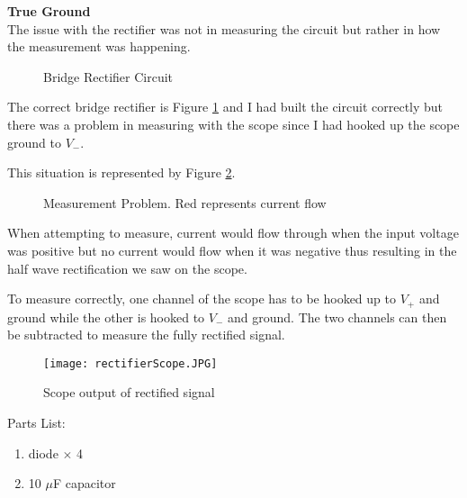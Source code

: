 \documentclass[oneside]{tufte-book}
\newenvironment{loggentry}[2]%
{\noindent\huge{\textbf{#2}}\normalsize\vspace{0.5cm}\marginnote{#1}\\}{\vspace{0.5cm}}
\begin{document}
\begin{loggentry}{2018-Aug-29}{True Ground}

    The issue with the rectifier was not in measuring the circuit but rather in how the measurement was happening.

  \begin{figure}
      \centering
      
      \caption{Bridge Rectifier Circuit}
      \label{correctBridgeRectifier}
  \end{figure}

    The correct bridge rectifier is Figure \ref{correctBridgeRectifier} and I had built the circuit correctly but there was a problem in measuring with the scope since I had hooked up the scope ground to $V_-$.

    This situation is represented by Figure \ref{bridgeRectifierProblem}.

    \begin{figure}
        \centering
        
        \caption{Measurement Problem. Red represents current flow}
        \label{bridgeRectifierProblem}
    \end{figure}

    When attempting to measure, current would flow through when the input voltage was positive but no current would flow when it was negative thus resulting in the half wave rectification we saw on the scope.

    To measure correctly, one channel of the scope has to be hooked up to $V_+$ and ground while the other is hooked to $V_-$ and ground. The two channels can then be subtracted to measure the fully rectified signal.

    \begin{figure}
        \centering
        \texttt{[image: rectifierScope.JPG]}
        \caption{Scope output of rectified signal}
        \label{rectifierScope}
    \end{figure}

    Parts List:
    \begin{enumerate}
      \item diode $\times$ 4
      \item 10 $\mu$F capacitor
    \end{enumerate}


\end{loggentry}
\end{document}
